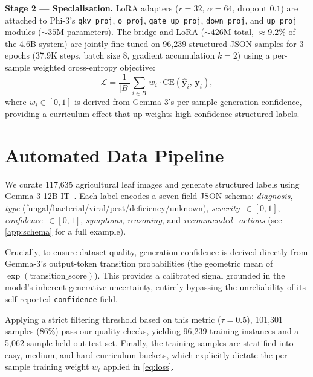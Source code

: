\documentclass{article}
\begin{document}
\smallskip\noindent\textbf{Stage 2 --- Specialisation.}
LoRA adapters ($r{=}32$, $\alpha{=}64$, dropout $0.1$) are attached to
Phi-3's \texttt{qkv\_proj}, \texttt{o\_proj}, \texttt{gate\_up\_proj},
\texttt{down\_proj}, and \texttt{up\_proj} modules (${\sim}35$M
parameters).
The bridge and LoRA (${{\sim}}426$M total, ${{\approx}}9.2\%$ of the 4.6B
system) are jointly fine-tuned on 96,239 structured JSON samples for 3 epochs
(37.9K steps, batch size 8, gradient accumulation $k{=}2$) using a
per-sample weighted cross-entropy objective:
\begin{equation}
  \mathcal{L} =
  \frac{1}{|B|} \sum_{i \in B}\, w_i \cdot
  \mathrm{CE}(\hat{\mathbf{y}}_i,\, \mathbf{y}_i),
  \label{eq:loss}
\end{equation}
where $w_i \in [0,1]$ is derived from Gemma-3's per-sample generation
confidence, providing a curriculum effect that up-weights
high-confidence structured labels.

\section{Automated Data Pipeline}
\label{sec:data}

We curate 117,635 agricultural leaf images and generate structured labels
using Gemma-3-12B-IT~\citep{gemmateam2025gemma3}.
Each label encodes a seven-field JSON schema: \emph{diagnosis}, \emph{type}
(fungal/bacterial/viral/pest/deficiency/unknown), \emph{severity}~$\in[0,1]$,
\emph{confidence}~$\in[0,1]$, \emph{symptoms}, \emph{reasoning}, and
\emph{recommended\_actions} (see \cref{app:schema} for a full example).

Crucially, to ensure dataset quality, generation confidence is derived directly from 
Gemma-3's output-token transition probabilities (the geometric mean of 
$\exp(\text{transition\_score})$). This provides a calibrated signal grounded in the 
model's inherent generative uncertainty, entirely bypassing the unreliability of its 
self-reported \texttt{confidence} field. 

Applying a strict filtering threshold based on this metric ($\tau{=}0.5$), 
101,301 samples (86\%) pass our quality checks, yielding 96,239 training instances 
and a 5,062-sample held-out test set. Finally, the training samples are stratified 
into easy, medium, and hard curriculum buckets, which explicitly dictate the 
per-sample training weight $w_i$ applied in \cref{eq:loss}.
\end{document}

